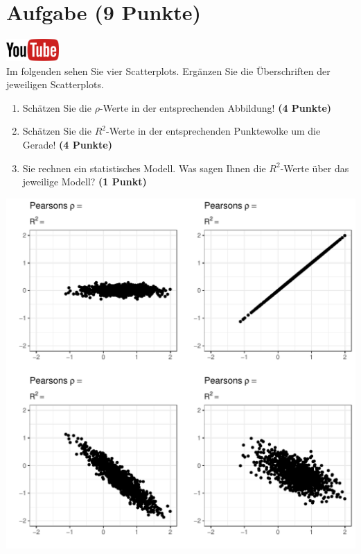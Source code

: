 \documentclass[a4paper, 10pt]{scrartcl}\usepackage[]{graphicx}\usepackage[]{xcolor}
\makeatletter
\def\maxwidth{ %
  \ifdim\Gin@nat@width>\linewidth
    \linewidth
  \else
    \Gin@nat@width
  \fi
}
\makeatother
\begin{document}
 
\clearpage

\section{Aufgabe \hfill (9 Punkte)}

\hfill\href{https://youtu.be/2QJa19ZwLls}{\includegraphics[width =
  2cm]{img/youtube}}\\[1Ex]

Im folgenden sehen Sie vier Scatterplots. Erg{\"a}nzen Sie die {\"U}berschriften
der jeweiligen Scatterplots.


\begin{enumerate}
\item Sch{\"a}tzen Sie die $\rho$-Werte in der entsprechenden
  Abbildung! \textbf{(4 Punkte)}
\item Sch{\"a}tzen Sie die $R^2$-Werte in der entsprechenden
  Punktewolke um die Gerade! \textbf{(4 Punkte)}
\item Sie rechnen ein statistisches Modell. Was sagen Ihnen die $R^2$-Werte
  {\"u}ber das jeweilige Modell? \textbf{(1 Punkt)}
\end{enumerate}




{\centering \includegraphics[width=\maxwidth]{img/correlation-02-1} 

}
\end{document}
